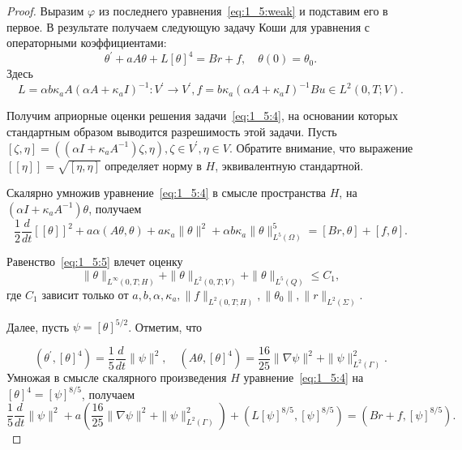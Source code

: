 \begin{proof}

    Выразим $\varphi$ из последнего уравнения~\eqref{eq:1_5:weak} и подставим его в первое.
    В результате получаем следующую задачу Коши для уравнения с операторными коэффициентами:
    \begin{equation}
        \label{eq:1_5:4}
        \theta^{\prime}+a A \theta+L[\theta]^{4}=B r+f, \quad \theta(0)=\theta_{0}.
    \end{equation}
    Здесь
    \[
        L=\alpha b \kappa_{a} A\left(\alpha A+\kappa_{a} I\right)^{-1}:
        V^{\prime} \rightarrow V^{\prime},
        f=b \kappa_{a}\left(\alpha A+\kappa_{a} I\right)^{-1} B u \in L^{2}(0, T ; V).
    \]

    Получим априорные оценки решения задачи~\eqref{eq:1_5:4},
    на основании которых стандартным образом выводится разрешимость этой задачи.
    Пусть $[\zeta, \eta]=\left(\left(\alpha I+\kappa_{a} A^{-1}\right) \zeta,
    \eta\right), \zeta \in V^{\prime}, \eta \in V$.
    Обратите внимание, что выражение $[[\eta]]=\sqrt{[\eta, \eta]}$
    определяет норму в $H$, эквивалентную стандартной.

    Скалярно умножив уравнение~\eqref{eq:1_5:4} в смысле пространства $H$,
    на $\left(\alpha I+\kappa_{a} A^{-1}\right) \theta$, получаем
    \begin{equation}
        \label{eq:1_5:5}
        \frac{1}{2} \frac{d}{d t}[[\theta]]^{2}+a \alpha(A \theta, \theta)
        +a \kappa_{a}\|\theta\|^{2}
        +\alpha b \kappa_{a}\|\theta\|_{L^{5}(\Omega)}^{5}=[B r, \theta]+[f, \theta].
    \end{equation}

    Равенство~\eqref{eq:1_5:5} влечет оценку
    \[
        \|\theta\|_{L^{\infty}(0, T ; H)}+\|\theta\|_{L^{2}(0, T ; V)}+\|\theta\|_{L^{5}(Q)} \leq C_{1},
    \]
    где $C_{1}$ зависит только от
    $a, b, \alpha, \kappa_{a},\|f\|_{L^{2}(0, T ; H)},\left\|\theta_{0}\right\|,\|r\|_{L^{2}(\Sigma)}$.

    Далее, пусть $\psi=[\theta]^{5 / 2}$.
    Отметим, что

    \[
        \left(\theta^{\prime},[\theta]^{4}\right)
        =\frac{1}{5} \frac{d}{d t}\|\psi\|^{2}, \quad\left(A \theta,[\theta]^{4}\right)
        =\frac{16}{25}\|\nabla \psi\|^{2}+\|\psi\|_{L^{2}(\Gamma)}^{2}.
    \]
    Умножая в смысле скалярного произведения $H$ уравнение~\eqref{eq:1_5:4}
    на $[\theta]^{4}=[\psi]^{8 / 5}$, получаем
    \begin{equation}
        \label{eq:1_5:6}
        \frac{1}{5} \frac{d}{d t}\|\psi\|^{2}
        +a\left(\frac{16}{25}\|\nabla \psi\|^{2}+\|\psi\|_{L^{2}(\Gamma)}^{2}\right)
        +\left(L[\psi]^{8 / 5},[\psi]^{8 / 5}\right)
        =\left(B r+f,[\psi]^{8 / 5}\right).
    \end{equation}



\end{proof}
